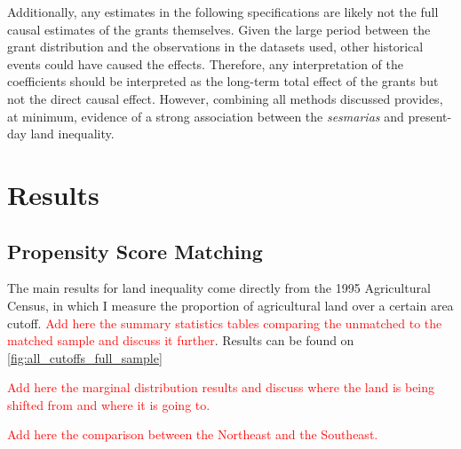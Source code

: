 \documentclass[11pt]{article}
\newcommand{\red}[1]{\textcolor{red}{#1}}
\begin{document}
Additionally, any estimates in the following specifications are likely not the full causal estimates of the grants themselves. 
Given the large period between the grant distribution and the observations in the datasets used, other historical events could have caused the effects. 
Therefore, any interpretation of the coefficients should be interpreted as the long-term total effect of the grants but not the direct causal effect.
However, combining all methods discussed provides, at minimum, evidence of a strong association between the \textit{sesmarias} and present-day land inequality.

\section{Results}
\label{sec:results}

\subsection{Propensity Score Matching}

The main results for land inequality come directly from the 1995 Agricultural Census, in which I measure the proportion of agricultural land over a certain area cutoff. 
\red{Add here the summary statistics tables comparing the unmatched to the matched sample and discuss it further}.
Results can be found on \autoref{fig:all_cutoffs_full_sample}

\red{Add here the marginal distribution results and discuss where the land is being shifted from and where it is going to.}

\red{Add here the comparison between the Northeast and the Southeast.}
\end{document}
